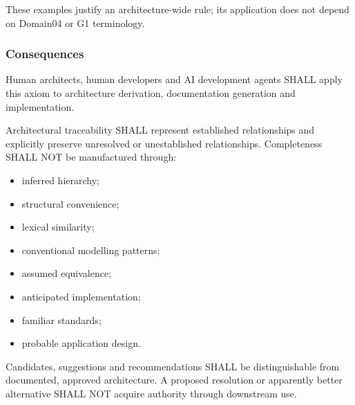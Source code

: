 These examples justify an architecture-wide rule; its application does not depend on Domain04 or G1 terminology.

\label{rad:axioms:822}
\subsubsection*{Consequences}
\label{rad:axioms:824}

Human architects, human developers and AI development agents SHALL apply this axiom to architecture derivation, documentation generation and implementation.

\label{rad:axioms:828}

Architectural traceability SHALL represent established relationships and explicitly preserve unresolved or unestablished relationships. Completeness SHALL NOT be manufactured through:

\label{rad:axioms:832}

\begin{itemize}

\item 
inferred hierarchy;



\item 
structural convenience;



\item 
lexical similarity;



\item 
conventional modelling patterns;



\item 
assumed equivalence;



\item 
anticipated implementation;



\item 
familiar standards;



\item 
probable application design.



\end{itemize}
\label{rad:axioms:841}

Candidates, suggestions and recommendations SHALL be distinguishable from documented, approved architecture. A proposed resolution or apparently better alternative SHALL NOT acquire authority through downstream use.

